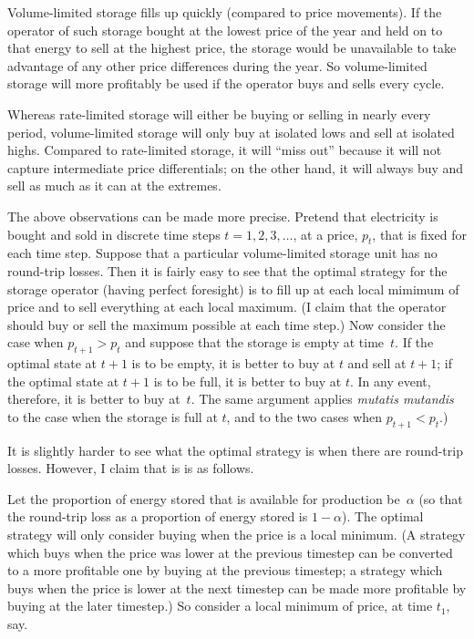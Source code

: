 \documentclass[12pt, a4paper]{article}
\begin{document}
Volume-limited storage fills up quickly (compared to price
movements). If the operator of such storage bought at the lowest price
of the year and held on to that energy to sell at the highest price,
the storage would be unavailable to take advantage of any other price
differences during the year. So volume-limited storage will more
profitably be used if the operator buys and sells every cycle.

Whereas rate-limited storage will either be buying or selling in
nearly every period, volume-limited storage will only buy at isolated
lows and sell at isolated highs. Compared to rate-limited storage, it
will ``miss out'' because it will not capture intermediate price
differentials; on the other hand, it will always buy and sell as much
as it can at the extremes. 

The above observations can be made more precise. Pretend that
electricity is bought and sold in discrete time steps $t = 1, 2,
3,\dots$, at a price, $p_t$, that is fixed for each time step. Suppose
that a particular volume-limited storage unit has no round-trip
losses. Then it is fairly easy to see that the optimal strategy for
the storage operator (having perfect foresight) is to fill up at each
local mimimum of price and to sell everything at each local
maximum. (I claim that the operator should buy or sell the maximum
possible at each time step.) Now consider the case when $p_{t+1} > p_t$
and suppose that the storage is empty at time~$t$. If the optimal
state at $t+1$ is to be empty, it is better to buy at $t$ and sell at
$t+1$; if the optimal state at $t+1$ is to be full, it is better to
buy at $t$. In any event, therefore, it is better to buy at~$t$. The
same argument applies \emph{mutatis mutandis} to the case when the
storage is full at $t$, and to the two cases when $p_{t+1} < p_t$.)

It is slightly harder to see what the optimal strategy is when there
are round-trip losses. However, I claim that is is as follows. 

Let the proportion of energy stored that is available for production
be~$\alpha$ (so that the round-trip loss as a proportion of energy
stored is $1-\alpha$). The optimal strategy will only consider buying
when the price is a local minimum. (A strategy which buys when the
price was lower at the previous timestep can be converted to a more
profitable one by buying at the previous timestep; a strategy which
buys when the price is lower at the next timestep can be made more
profitable by buying at the later timestep.) So consider a local
minimum of price, at time $t_1$, say.
\end{document}
